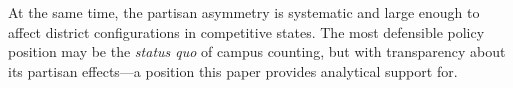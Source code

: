 At the same time, the partisan asymmetry is systematic and large enough to affect district configurations in competitive states. The most defensible policy position may be the \emph{status quo} of campus counting, but with transparency about its partisan effects---a position this paper provides analytical support for.

